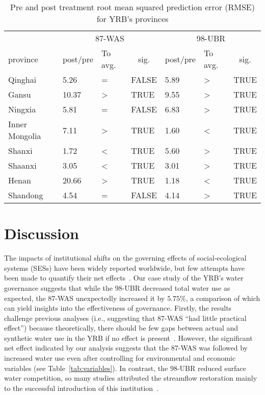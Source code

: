 \documentclass[preprint, 12pt]{elsarticle}
\begin{document}
\begin{table}[!htbp]\footnotesize
	\centering
	\caption{Pre and post treatment root mean squared prediction error (RMSE) for YRB's provinces}\label{tab:DSC_summary}
	\begin{tabularx}{0.8\textwidth}{XXXXXXX}
	  \toprule
			& \multicolumn{3}{c}{87-WAS} & \multicolumn{3}{c}{98-UBR} \\
  \cmidrule{2-7}    province  & \multicolumn{1}{c}{post/pre} & To avg. & \multicolumn{1}{c}{sig.} & \multicolumn{1}{c}{post/pre} & To avg.   & \multicolumn{1}{c}{sig.} \\
	  \midrule
	  Qinghai & 5.26  & =     & FALSE & 5.89  & >     & TRUE \\
	  Gansu & 10.37  & >     & TRUE  & 9.55  & >     & TRUE \\
	  Ningxia & 5.81  & =     & FALSE & 6.83  & >     & TRUE \\
	  Inner Mongolia & 7.11  & >     & TRUE  & 1.60  & <     & TRUE \\
	  Shanxi & 1.72  & <     & TRUE  & 5.60  & >     & TRUE \\
	  Shaanxi & 3.05  & <     & TRUE  & 3.01  & >     & TRUE \\
	  Henan & 20.66  & >     & TRUE  & 1.18  & <     & TRUE \\
	  Shandong & 4.54  & =     & FALSE & 4.14  & >     & TRUE \\
	  \bottomrule
	  \end{tabularx}\label{tab:addlabel}\end{table}
\section{Discussion}\label{sec:discussion}


The impacts of institutional shifts on the governing effects of social-ecological systems (SESs) have been widely reported worldwide, but few attempts have been made to quantify their net effects~\cite{cumming2020a}.
Our case study of the YRB's water governance suggests that while the 98-UBR decreased total water use as expected, the 87-WAS unexpectedly increased it by $5.75\%$, a comparison of which can yield insights into the effectiveness of governance.
Firstly, the results challenge previous analyses (i.e., suggesting that 87-WAS ``had little practical effect'') because theoretically, there should be few gaps between actual and synthetic water use in the YRB if no effect is present~\cite{abadie2015,hill2021}.
However, the significant net effect indicated by our analysis suggests that the 87-WAS was followed by increased water use even after controlling for environmental and economic variables (see \textit{} Table~\ref{tab:variables}).
In contrast, the 98-UBR reduced surface water competition, so many studies attributed the streamflow restoration mainly to the successful introduction of this institution~\cite{chen2021,huangang2002,an2007}.
\end{document}
